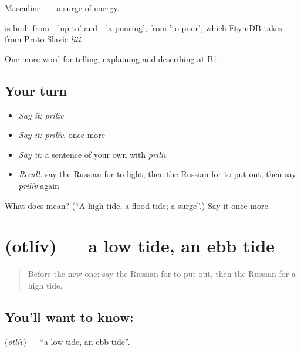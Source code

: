 Masculine. \emph{ } — a surge of energy.

\begin{cousinweb}
\emph{} is built from \emph{-} 'up to' and \emph{-} 'a pouring', from \emph{} 'to pour', which EtymDB takes from Proto-Slavic \emph{liti}.
\end{cousinweb}

\begin{grammarlens}[title={What you've built}]
One more word for telling, explaining and describing at B1.
\end{grammarlens}

\subsection*{Your turn}
\begin{itemize}
\raggedright
  \item \emph{Say it:} \emph{prilív}
  \item \emph{Say it:} \emph{prilív}, once more
  \item \emph{Say it:} a sentence of your own with \emph{prilív}
  \item \emph{Recall:} say the Russian for to light, then the Russian for to put out, then say \emph{prilív} again
\end{itemize}

\begin{tcolorbox}[breakable,colback=teal!4,colframe=teal!35!black,title={Before you move on}]
What does  mean? (\textquotedblleft{}A high tide, a flood tide; a surge\textquotedblright{}.) Say it once more.
\end{tcolorbox}
\section[\texorpdfstring{\ru{отлив} (otlív)}{отлив (otlív)}]{ (otlív) — a low tide, an ebb tide}

\label{lesson:RU-C463-otliv}



\begin{quote}
Before the new one: say the Russian for to put out, then the Russian for a high tide.
\end{quote}

\subsection*{You'll want to know: }
\textbf{} (\emph{otlív}) — \textquotedblleft{}a low tide, an ebb tide\textquotedblright{}.

